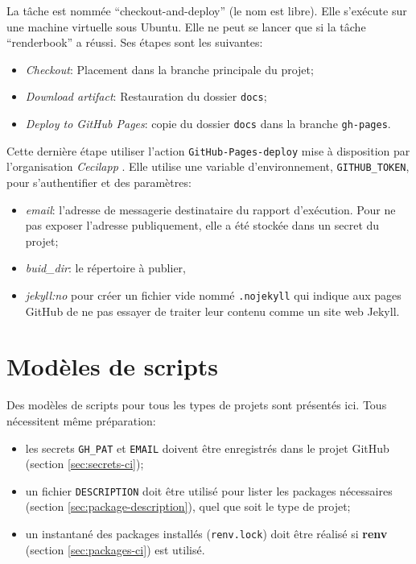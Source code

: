 \documentclass[
  12pt,
  french,
  a4paper,
  extrafontsizes,onecolumn,openright
  ]{memoir}
\providecommand{\tightlist}{%
  \setlength{\itemsep}{0pt}\setlength{\parskip}{0pt}}
\begin{document}
La tâche est nommée \enquote{checkout-and-deploy} (le nom est libre).
Elle s'exécute sur une machine virtuelle sous Ubuntu.
Elle ne peut se lancer que si la tâche \enquote{renderbook} a réussi.
Ses étapes sont les suivantes:

\begin{itemize}
\tightlist
\item
  \emph{Checkout}: Placement dans la branche principale du projet;
\item
  \emph{Download artifact}: Restauration du dossier \texttt{docs};
\item
  \emph{Deploy to GitHub Pages}: copie du dossier \texttt{docs} dans la branche \texttt{gh-pages}.
\end{itemize}

Cette dernière étape utiliser l'action \texttt{GitHub-Pages-deploy} mise à disposition par l'organisation \emph{Cecilapp} .
Elle utilise une variable d'environnement, \texttt{GITHUB\_TOKEN}, pour s'authentifier et des paramètres:

\begin{itemize}
\tightlist
\item
  \emph{email}: l'adresse de messagerie destinataire du rapport d'exécution.
  Pour ne pas exposer l'adresse publiquement, elle a été stockée dans un secret du projet;
\item
  \emph{buid\_dir}: le répertoire à publier,
\item
  \emph{jekyll:no} pour créer un fichier vide nommé \texttt{.nojekyll} qui indique aux pages GitHub de ne pas essayer de traiter leur contenu comme un site web Jekyll.
\end{itemize}

\hypertarget{moduxe8les-de-scripts}{%
\section{Modèles de scripts}\label{moduxe8les-de-scripts}}

Des modèles de scripts pour tous les types de projets sont présentés ici.
Tous nécessitent même préparation:

\begin{itemize}
\tightlist
\item
  les secrets \texttt{GH\_PAT} et \texttt{EMAIL} doivent être enregistrés dans le projet GitHub (section \ref{sec:secrets-ci});
\item
  un fichier \texttt{DESCRIPTION} doit être utilisé pour lister les packages nécessaires (section \ref{sec:package-description}), quel que soit le type de projet;
\item
  un instantané des packages installés (\texttt{renv.lock}) doit être réalisé si \textbf{renv} (section \ref{sec:packages-ci}) est utilisé.
\end{itemize}
\end{document}
